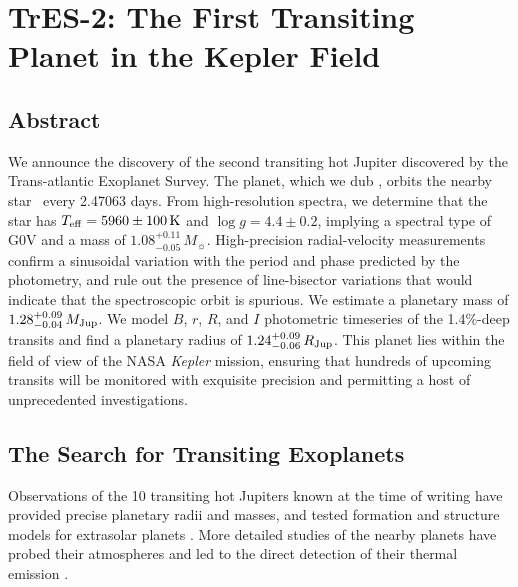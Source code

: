 \chapter[TrES-2: The First Transiting Planet in the Kepler Field]%
{%
TrES-2: The First Transiting Planet in the Kepler Field%
\protect\CFNC%
}\label{cha:tres2}

\section*{Abstract}\label{cha:tres2:sec:abs}

We announce the discovery of the second transiting hot Jupiter
discovered by the Trans-atlantic Exoplanet Survey. The planet, which
we dub \tresTwo, orbits the nearby star \gscOTF\ every 2.47063 days.  From
high-resolution spectra, we determine that the star has $T_{\rm
  eff}=5960\pm100\,\mathrm{K}$ and $\log{g}=4.4\pm0.2$, implying a
spectral type of G0V and a mass of $1.08^{+0.11}_{-0.05}\,M_{\sun}$.
High-precision radial-velocity measurements confirm a sinusoidal
variation with the period and phase predicted by the photometry, and
rule out the presence of line-bisector variations that
would indicate that the spectroscopic orbit is spurious.  We estimate
a planetary mass of $1.28^{+0.09}_{-0.04}\,M_{\rm Jup}$.  We model
$B$, $r$, $R$, and $I$ photometric timeseries of the 1.4\%-deep
transits and find a planetary radius of $1.24^{+0.09}_{-0.06}\,R_{\rm
  Jup}$.  This planet lies within the field of view of the NASA
\textit{Kepler} mission, ensuring that hundreds of upcoming transits
will be monitored with exquisite precision and permitting a host of
unprecedented investigations.

\section{The Search for Transiting Exoplanets}\label{cha:tres2:sec:intro}

Observations of the 10 transiting hot Jupiters known at the time of writing have provided
precise planetary radii and masses, and tested formation and structure
models for extrasolar planets
\citep[see][]{Laughlin_Wolf_Vanmunster:apj:2005a,
  Charbonneau_Brown_Burrows:PPV:2007a}. More detailed studies of the
nearby planets have probed their atmospheres and led to the direct
detection of their thermal emission
\citep[e.g.,][]{Charbonneau_Brown_Noyes:apj:2002a,
  Charbonneau_Allen_Megeath:apj:2005a,
  Deming_Brown_Charbonneau:apj:2005a,
  Deming_Seager_Richardson:nat:2005a}.

